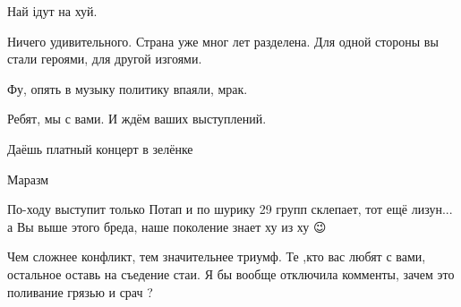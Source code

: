 \begin{itemize}
Най ідут на хуй.

 
Ничего удивительного. Страна уже мног лет разделена. Для одной стороны вы стали героями, для другой изгоями.

 

Фу, опять в музыку политику впаяли, мрак.🤮

Ребят, мы с вами. И ждём ваших выступлений.🤜🤛

 
Даёшь платный концерт в зелёнке

 
Маразм

 
По-ходу выступит только Потап и по шурику 29 групп склепает, тот ещё лизун... а Вы выше этого бреда, наше поколение знает ху из ху 😉

 
Чем сложнее конфликт, тем значительнее триумф. Те ,кто вас любят с вами, остальное
оставь на съедение стаи. Я бы вообще отключила комменты, зачем это поливание
грязью и срач ?


\end{itemize}
